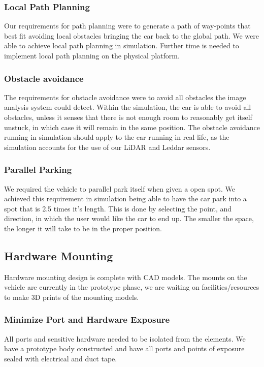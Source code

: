 \documentclass[compsoc,draftclsnofoot,onecolumn,10pt]{IEEEtran}
\begin{document}
\subsubsection{Local Path Planning}
Our requirements for path planning were to generate a path of way-points that best fit avoiding local obstacles bringing the car back to the global path.  We were able to achieve local path planning in simulation. Further time is needed to implement local path planning on the physical platform.


\subsubsection{Obstacle avoidance}
The requirements for obstacle avoidance were to avoid all obstacles the image analysis system could detect.
Within the simulation, the car is able to avoid all obstacles, unless it senses that there is not enough room to reasonably get itself unstuck, in which case it will remain in the same position. The obstacle avoidance running in simulation should apply to the car running in real life, as the simulation accounts for the use of our LiDAR and Leddar sensors.


\subsubsection{Parallel Parking}
We required the vehicle to parallel park itself when given a open spot. We achieved this requirement in simulation being able to have the car park into a spot that is 2.5 times it's length. This is done by selecting the point, and direction, in which the user would like the car to end up. The smaller the space, the longer it will take to be in the proper position.


\subsection{Hardware Mounting}
Hardware mounting design is complete with CAD models. The mounts on the vehicle are currently in the prototype phase, we are waiting on facilities/resources to make 3D prints of the mounting models.

\subsubsection{Minimize Port and Hardware Exposure}
All ports and sensitive hardware needed to be isolated from the elements.  We have a prototype body constructed and have all ports and points of exposure sealed with electrical and duct tape.
\end{document}
